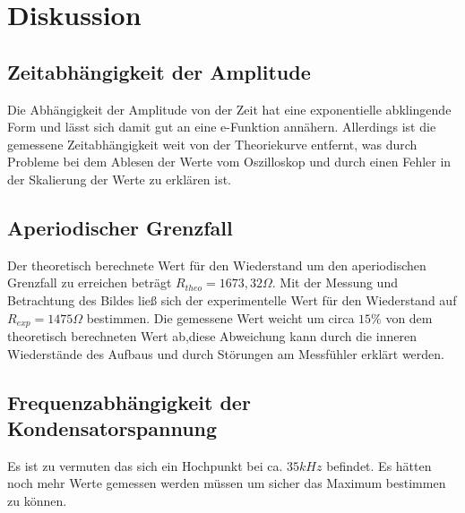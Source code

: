 \newpage
\section{Diskussion}
\label{sec:Diskussion}
\subsection{Zeitabhängigkeit der Amplitude}
Die Abhängigkeit der Amplitude von der Zeit hat eine exponentielle abklingende Form und lässt sich damit gut an eine e-Funktion annähern.
Allerdings ist die gemessene Zeitabhängigkeit weit von der Theoriekurve entfernt, was durch Probleme bei dem Ablesen der Werte vom Oszilloskop
und durch einen Fehler in der Skalierung der Werte zu erklären ist.
\subsection{Aperiodischer Grenzfall}
Der theoretisch berechnete Wert für den Wiederstand um den aperiodischen Grenzfall zu erreichen beträgt $R_{theo}=1673,32 \Omega$.
Mit der Messung und Betrachtung des Bildes ließ sich der experimentelle Wert für den Wiederstand auf $R_{exp} = 1475\Omega$ bestimmen.
Die gemessene Wert weicht um circa $15\%$ von dem theoretisch berechneten Wert ab,diese Abweichung kann durch die inneren Wiederstände des Aufbaus und durch Störungen am Messfühler erklärt werden.

\subsection{Frequenzabhängigkeit der Kondensatorspannung}
Es ist zu vermuten das sich ein Hochpunkt bei ca. $35kHz$ befindet.
Es hätten noch mehr Werte gemessen werden müssen um sicher das Maximum bestimmen zu können.